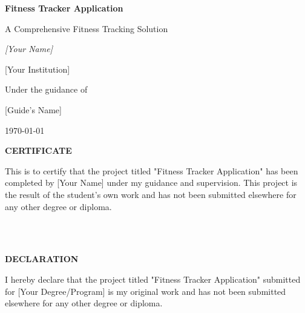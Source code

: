 \documentclass[12pt,a4paper,oneside]{report}
\begin{document}
\begin{titlepage}
    \centering
    \vspace*{2cm}
    {\Huge\bfseries Fitness Tracker Application\par}
    \vspace{1.5cm}
    {\Large A Comprehensive Fitness Tracking Solution\par}
    \vspace{2cm}
    {\Large\itshape [Your Name]\par}
    \vspace{1cm}
    {\large [Your Institution]\par}
    \vspace{1cm}
    {\large Under the guidance of\par}
    {\large [Guide's Name]\par}
    \vspace{2cm}
    {\large \today\par}
\end{titlepage}

\newpage
\thispagestyle{empty}
\vspace*{2cm}
\begin{center}
    \textbf{CERTIFICATE}
\end{center}
\vspace{1cm}
This is to certify that the project titled "Fitness Tracker Application" has been completed by [Your Name] under my guidance and supervision. This project is the result of the student's own work and has not been submitted elsewhere for any other degree or diploma.

\vspace{2cm}
\begin{flushright}
    \\
    [Designation]\\
    [Institution]
\end{flushright}

\newpage
\thispagestyle{empty}
\vspace*{2cm}
\begin{center}
    \textbf{DECLARATION}
\end{center}
\vspace{1cm}
I hereby declare that the project titled "Fitness Tracker Application" submitted for [Your Degree/Program] is my original work and has not been submitted elsewhere for any other degree or diploma.

\vspace{2cm}
\begin{flushright}
    \\
    [Your Roll Number]
\end{flushright}
\end{document}
